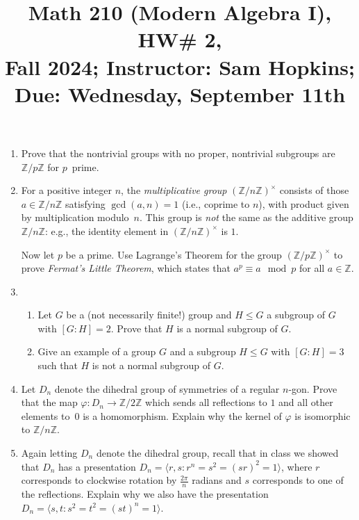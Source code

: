 \documentclass[11pt]{article}
\title{Math 210 (Modern Algebra I), HW\# 2, \\ {\normalsize Fall 2024; Instructor: Sam Hopkins; Due: Wednesday, September 11th}}
\date{}
\begin{document}
\maketitle

\thispagestyle{empty}
\begin{enumerate}

\item Prove that the nontrivial groups with no proper, nontrivial subgroups are $\mathbb{Z}/p\mathbb{Z}$ for $p$~prime.

\item For a positive integer $n$, the \emph{multiplicative group} $(\mathbb{Z}/n\mathbb{Z})^\times$ consists of those $a\in \mathbb{Z}/n\mathbb{Z}$ satisfying $\gcd(a,n)=1$ (i.e., coprime to $n$), with product given by multiplication modulo~$n$. This group is \emph{not} the same as the additive group $\mathbb{Z}/n\mathbb{Z}$: e.g., the identity element in $(\mathbb{Z}/n\mathbb{Z})^\times$ is $1$.

Now let $p$ be a prime. Use Lagrange's Theorem for the group $(\mathbb{Z}/p\mathbb{Z})^\times$ to prove \emph{Fermat's Little Theorem}, which states that $a^p \equiv a \mod p$ for all $a\in \mathbb{Z}$.

\item \begin{enumerate}
\item Let $G$ be a (not necessarily finite!) group and $H \leq G$ a subgroup of $G$ with $[G:H]=2$. Prove that $H$ is a normal subgroup of $G$.

\item Give an example of a group $G$ and a subgroup $H \leq G$ with $[G:H]=3$ such that $H$ is not a normal subgroup of $G$.
\end{enumerate}

\item Let $D_n$ denote the dihedral group of symmetries of a regular $n$-gon. Prove that the map $\varphi\colon D_n \to \mathbb{Z}/2\mathbb{Z}$ which sends all reflections to $1$ and all other elements to~$0$ is a homomorphism. Explain why the kernel of $\varphi$ is isomorphic to $\mathbb{Z}/n\mathbb{Z}$.

\item Again letting $D_n$ denote the dihedral group, recall that in class we showed that $D_n$ has a presentation $D_n = \langle r,s \colon r^n = s^2 = (sr)^2=1\rangle$, where $r$ corresponds to clockwise rotation by $\frac{2\pi}{n}$ radians and $s$ corresponds to one of the reflections. Explain why we also have the presentation $D_n = \langle s,t \colon s^2 = t^2 = (st)^n = 1\rangle$.



\end{enumerate}
\end{document}
